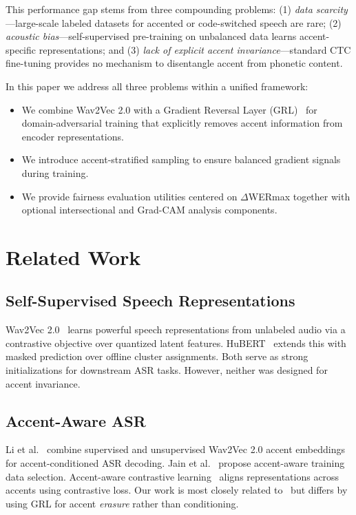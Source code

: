 \documentclass[10pt,twocolumn,letterpaper]{article}
\begin{document}
This performance gap stems from three compounding problems: (1) \textit{data scarcity}—large-scale labeled datasets for accented or code-switched speech are rare; (2) \textit{acoustic bias}—self-supervised pre-training on unbalanced data learns accent-specific representations; and (3) \textit{lack of explicit accent invariance}—standard CTC fine-tuning provides no mechanism to disentangle accent from phonetic content.

In this paper we address all three problems within a unified framework:
\begin{itemize}
    \item We combine Wav2Vec 2.0 with a Gradient Reversal Layer (GRL)~\cite{ganin2016domain} for domain-adversarial training that explicitly removes accent information from encoder representations.
    \item We introduce accent-stratified sampling to ensure balanced gradient signals during training.
    \item We provide fairness evaluation utilities centered on $\Delta$WERmax together with optional intersectional and Grad-CAM analysis components.
\end{itemize}

\section{Related Work}

\subsection{Self-Supervised Speech Representations}

Wav2Vec 2.0~\cite{baevski2020wav2vec2} learns powerful speech representations from unlabeled audio via a contrastive objective over quantized latent features. HuBERT~\cite{hsu2021hubert} extends this with masked prediction over offline cluster assignments. Both serve as strong initializations for downstream ASR tasks. However, neither was designed for accent invariance.

\subsection{Accent-Aware ASR}

Li et al.~\cite{li2021accentasr} combine supervised and unsupervised Wav2Vec 2.0 accent embeddings for accent-conditioned ASR decoding. Jain et al.~\cite{jain2018improved} propose accent-aware training data selection. Accent-aware contrastive learning~\cite{yi2022accentcontrastive} aligns representations across accents using contrastive loss. Our work is most closely related to~\cite{li2021accentasr} but differs by using GRL for accent \textit{erasure} rather than conditioning.
\end{document}
